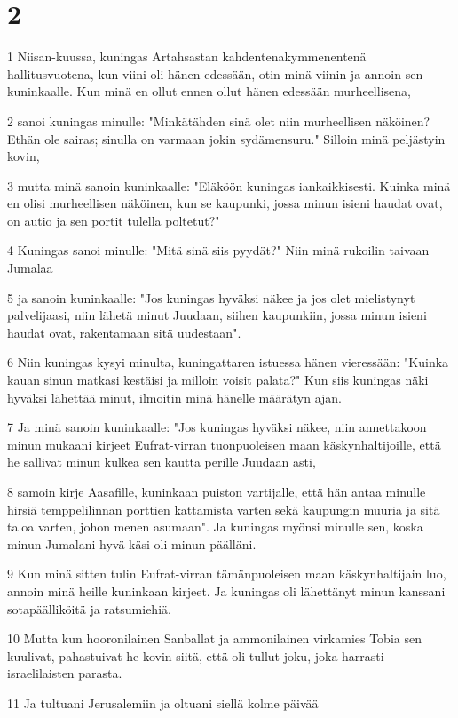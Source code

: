 \chapter{2}

\par 1 Niisan-kuussa, kuningas Artahsastan kahdentenakymmenentenä hallitusvuotena, kun viini oli hänen edessään, otin minä viinin ja annoin sen kuninkaalle. Kun minä en ollut ennen ollut hänen edessään murheellisena,
\par 2 sanoi kuningas minulle: "Minkätähden sinä olet niin murheellisen näköinen? Ethän ole sairas; sinulla on varmaan jokin sydämensuru." Silloin minä peljästyin kovin,
\par 3 mutta minä sanoin kuninkaalle: "Eläköön kuningas iankaikkisesti. Kuinka minä en olisi murheellisen näköinen, kun se kaupunki, jossa minun isieni haudat ovat, on autio ja sen portit tulella poltetut?"
\par 4 Kuningas sanoi minulle: "Mitä sinä siis pyydät?" Niin minä rukoilin taivaan Jumalaa
\par 5 ja sanoin kuninkaalle: "Jos kuningas hyväksi näkee ja jos olet mielistynyt palvelijaasi, niin lähetä minut Juudaan, siihen kaupunkiin, jossa minun isieni haudat ovat, rakentamaan sitä uudestaan".
\par 6 Niin kuningas kysyi minulta, kuningattaren istuessa hänen vieressään: "Kuinka kauan sinun matkasi kestäisi ja milloin voisit palata?" Kun siis kuningas näki hyväksi lähettää minut, ilmoitin minä hänelle määrätyn ajan.
\par 7 Ja minä sanoin kuninkaalle: "Jos kuningas hyväksi näkee, niin annettakoon minun mukaani kirjeet Eufrat-virran tuonpuoleisen maan käskynhaltijoille, että he sallivat minun kulkea sen kautta perille Juudaan asti,
\par 8 samoin kirje Aasafille, kuninkaan puiston vartijalle, että hän antaa minulle hirsiä temppelilinnan porttien kattamista varten sekä kaupungin muuria ja sitä taloa varten, johon menen asumaan". Ja kuningas myönsi minulle sen, koska minun Jumalani hyvä käsi oli minun päälläni.
\par 9 Kun minä sitten tulin Eufrat-virran tämänpuoleisen maan käskynhaltijain luo, annoin minä heille kuninkaan kirjeet. Ja kuningas oli lähettänyt minun kanssani sotapäälliköitä ja ratsumiehiä.
\par 10 Mutta kun hooronilainen Sanballat ja ammonilainen virkamies Tobia sen kuulivat, pahastuivat he kovin siitä, että oli tullut joku, joka harrasti israelilaisten parasta.
\par 11 Ja tultuani Jerusalemiin ja oltuani siellä kolme päivää
